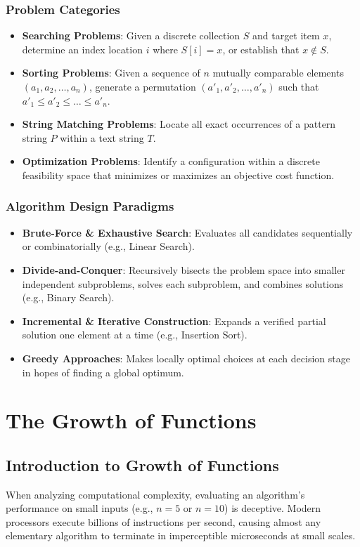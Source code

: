 \documentclass[11pt,a4paper,oneside]{report}
\theoremstyle{definition}
\begin{document}
\subsection{Problem Categories}
\begin{itemize}
    \item \textbf{Searching Problems}: Given a discrete collection $S$ and target item $x$, determine an index location $i$ where $S[i] = x$, or establish that $x \notin S$.
    \item \textbf{Sorting Problems}: Given a sequence of $n$ mutually comparable elements $(a_1, a_2, \dots, a_n)$, generate a permutation $(a'_1, a'_2, \dots, a'_n)$ such that $a'_1 \le a'_2 \le \dots \le a'_n$.
    \item \textbf{String Matching Problems}: Locate all exact occurrences of a pattern string $P$ within a text string $T$.
    \item \textbf{Optimization Problems}: Identify a configuration within a discrete feasibility space that minimizes or maximizes an objective cost function.
\end{itemize}

\subsection{Algorithm Design Paradigms}
\begin{itemize}
    \item \textbf{Brute-Force \& Exhaustive Search}: Evaluates all candidates sequentially or combinatorially (e.g., Linear Search).
    \item \textbf{Divide-and-Conquer}: Recursively bisects the problem space into smaller independent subproblems, solves each subproblem, and combines solutions (e.g., Binary Search).
    \item \textbf{Incremental \& Iterative Construction}: Expands a verified partial solution one element at a time (e.g., Insertion Sort).
    \item \textbf{Greedy Approaches}: Makes locally optimal choices at each decision stage in hopes of finding a global optimum.
\end{itemize}

\chapter{The Growth of Functions}
\label{chap:growth}

\section{Introduction to Growth of Functions}
When analyzing computational complexity, evaluating an algorithm's performance on small inputs (e.g., $n = 5$ or $n = 10$) is deceptive. Modern processors execute billions of instructions per second, causing almost any elementary algorithm to terminate in imperceptible microseconds at small scales. 
\end{document}
